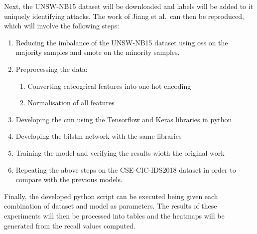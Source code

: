 Next, the UNSW-NB15 dataset will be downloaded and labels will be added to it
uniquely identifying attacks. The work of Jiang et al.\ can then be reproduced,
which will involve the following steps:
\begin{enumerate}
    \item Reducing the imbalance of the UNSW-NB15 dataset using \gls{oss} on the majority
          samples and \gls{smote} on the minority samples.
    \item Preprocessing the data:
          \begin{enumerate}
              \item Converting cateogrical features into one-hot encoding
              \item Normalisation of all features
          \end{enumerate}
    \item Developing the \gls{cnn} using the Tensorflow and Keras libraries in python
    \item Developing the \gls{bilstm} network with the same libraries
    \item Training the model and verifying the results wioth the original work
    \item Repeating the above steps on the CSE-CIC-IDS2018 dataset in order to compare
          with the previous models.
\end{enumerate}

Finally, the developed python script can be executed being given each
combination of dataset and model as parameters. The results of these
experiments will then be processed into tables and the heatmaps will be
generated from the recall values computed.
